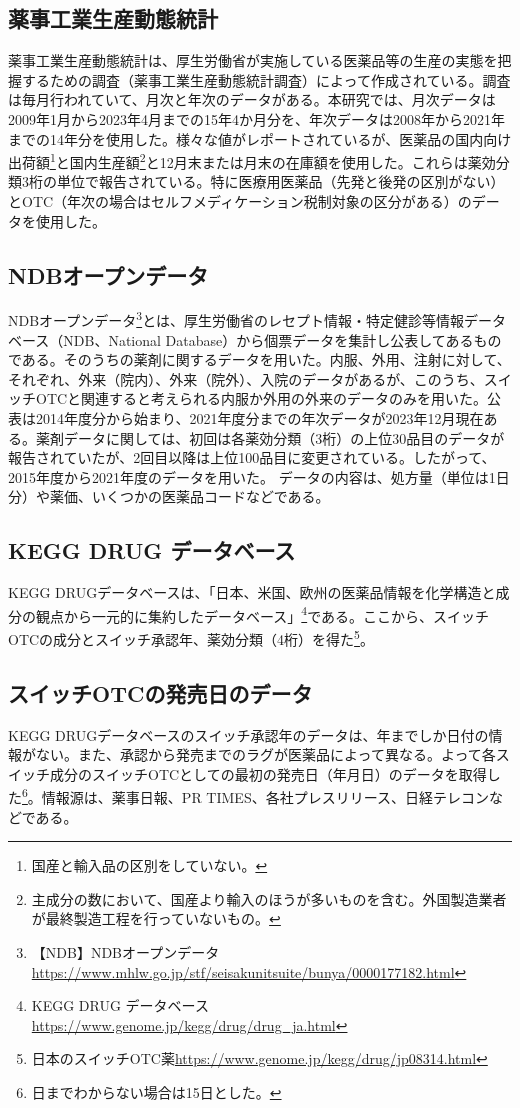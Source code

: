 \documentclass[a4paper,11pt,uplatex]{jsarticle}
\theoremstyle{definition}
\begin{document}
\subsection{薬事工業生産動態統計}
薬事工業生産動態統計は、厚生労働省が実施している医薬品等の生産の実態を把握するための調査（薬事工業生産動態統計調査）によって作成されている。調査は毎月行われていて、月次と年次のデータがある。本研究では、月次データは2009年1月から2023年4月までの15年4か月分を、年次データは2008年から2021年までの14年分を使用した。様々な値がレポートされているが、医薬品の国内向け出荷額\footnote{国産と輸入品の区別をしていない。}と国内生産額\footnote{主成分の数において、国産より輸入のほうが多いものを含む。外国製造業者が最終製造工程を行っていないもの。}と12月末または月末の在庫額を使用した。これらは薬効分類3桁の単位で報告されている。特に医療用医薬品（先発と後発の区別がない）とOTC（年次の場合はセルフメディケーション税制対象の区分がある）のデータを使用した。
\subsection{NDBオープンデータ}
NDBオープンデータ\footnote{【NDB】NDBオープンデータ\url{https://www.mhlw.go.jp/stf/seisakunitsuite/bunya/0000177182.html}}とは、厚生労働省のレセプト情報・特定健診等情報データベース（NDB、National Database）から個票データを集計し公表してあるものである。そのうちの薬剤に関するデータを用いた。内服、外用、注射に対して、それぞれ、外来（院内）、外来（院外）、入院のデータがあるが、このうち、スイッチOTCと関連すると考えられる内服か外用の外来のデータのみを用いた。公表は2014年度分から始まり、2021年度分までの年次データが2023年12月現在ある。薬剤データに関しては、初回は各薬効分類（3桁）の上位30品目のデータが報告されていたが、2回目以降は上位100品目に変更されている。したがって、2015年度から2021年度のデータを用いた。 データの内容は、処方量（単位は1日分）や薬価、いくつかの医薬品コードなどである。
\subsection{KEGG DRUG データベース}
KEGG DRUGデータベースは、「日本、米国、欧州の医薬品情報を化学構造と成分の観点から一元的に集約したデータベース」\footnote{KEGG DRUG データベース\url{https://www.genome.jp/kegg/drug/drug_ja.html}}である。ここから、スイッチOTCの成分とスイッチ承認年、薬効分類（4桁）を得た\footnote{ 日本のスイッチOTC薬\url{https://www.genome.jp/kegg/drug/jp08314.html}}。
\subsection{スイッチOTCの発売日のデータ}
KEGG DRUGデータベースのスイッチ承認年のデータは、年までしか日付の情報がない。また、承認から発売までのラグが医薬品によって異なる。よって各スイッチ成分のスイッチOTCとしての最初の発売日（年月日）のデータを取得した\footnote{日までわからない場合は15日とした。}。情報源は、薬事日報、PR TIMES、各社プレスリリース、日経テレコンなどである。
\end{document}

